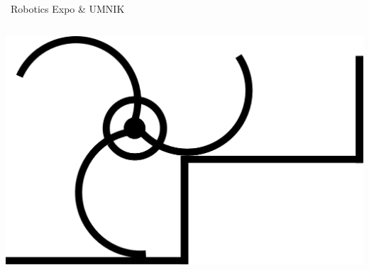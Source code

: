 \documentclass{beamer}
\begin{document}
\begin{frame}{\quad \quad ~Robotics Expo \& UMNIK}
\begin{columns}
\begin{column}{0.49\textwidth}
\newline{}
\vskip 0.3cm
\includegraphics[height=0.5\textwidth]{Pictures/wheel_opened}
\end{column}
\end{columns}
\end{frame}
\end{document}
